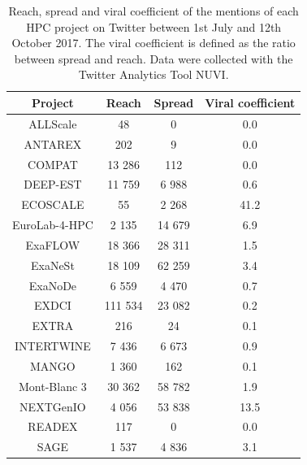 \begin{table}[t]
 \begin{center}
 {\scriptsize
  \begin{tabular}{cccc}
   \hline 
   \hline
   Project & Reach & Spread & Viral coefficient \\ 
   \hline
   \hline
   ALLScale & 48 & 0 & 0.0 \\
   ANTAREX & 202 & 9 & 0.0 \\
   COMPAT & 13 286 & 112 & 0.0 \\
   DEEP-EST & 11 759 & 6 988 & 0.6 \\
   ECOSCALE & 55 & 2 268 & 41.2 \\
   EuroLab-4-HPC & 2 135 & 14 679 & 6.9 \\
   ExaFLOW & 18 366 & 28 311 & 1.5 \\
   ExaNeSt & 18 109 & 62 259 & 3.4  \\
   ExaNoDe & 6 559 & 4 470 & 0.7 \\
   EXDCI & 111 534 & 23 082 & 0.2 \\
   EXTRA & 216 & 24 & 0.1 \\
   INTERTWINE & 7 436 & 6 673 & 0.9 \\
   MANGO & 1 360 & 162 & 0.1 \\
   Mont-Blanc 3 & 30 362 & 58 782 & 1.9 \\
   NEXTGenIO & 4 056 & 53 838 & 13.5 \\
   READEX & 117 & 0 & 0.0 \\
   SAGE & 1 537 & 4 836 & 3.1 \\ 
   \hline
   \hline
  \end{tabular}
 } 
 \end{center} 
 \caption{Reach, spread and viral coefficient of the mentions of each HPC project on Twitter between 1st July and 12th October 2017. The viral coefficient is defined as the ratio between spread and reach. Data were collected with the Twitter Analytics Tool NUVI.}
\label{HPC_viral_coefficients} 
\end{table}